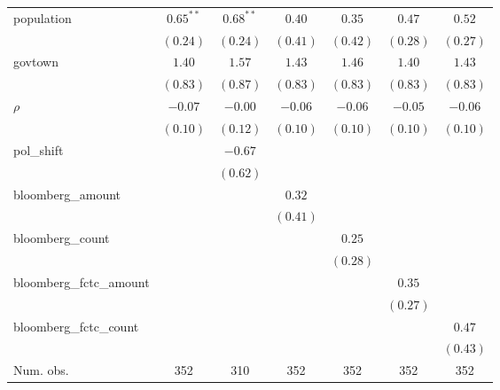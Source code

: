 \begin{table}[!h]
\begin{center}
\begin{tabular}{l c c c c c c }
population              & $0.65^{**}$  & $0.68^{**}$  & $0.40$       & $0.35$       & $0.47$       & $0.52$       \\
                        & $(0.24)$     & $(0.24)$     & $(0.41)$     & $(0.42)$     & $(0.28)$     & $(0.27)$     \\
govtown                 & $1.40$       & $1.57$       & $1.43$       & $1.46$       & $1.40$       & $1.43$       \\
                        & $(0.83)$     & $(0.87)$     & $(0.83)$     & $(0.83)$     & $(0.83)$     & $(0.83)$     \\
$\rho$                  & $-0.07$      & $-0.00$      & $-0.06$      & $-0.06$      & $-0.05$      & $-0.06$      \\
                        & $(0.10)$     & $(0.12)$     & $(0.10)$     & $(0.10)$     & $(0.10)$     & $(0.10)$     \\
pol\_shift              &              & $-0.67$      &              &              &              &              \\
                        &              & $(0.62)$     &              &              &              &              \\
bloomberg\_amount       &              &              & $0.32$       &              &              &              \\
                        &              &              & $(0.41)$     &              &              &              \\
bloomberg\_count        &              &              &              & $0.25$       &              &              \\
                        &              &              &              & $(0.28)$     &              &              \\
bloomberg\_fctc\_amount &              &              &              &              & $0.35$       &              \\
                        &              &              &              &              & $(0.27)$     &              \\
bloomberg\_fctc\_count  &              &              &              &              &              & $0.47$       \\
                        &              &              &              &              &              & $(0.43)$     \\
\midrule
Num. obs.               & 352          & 310          & 352          & 352          & 352          & 352          \\

\end{tabular}
\end{center}
\end{table}
